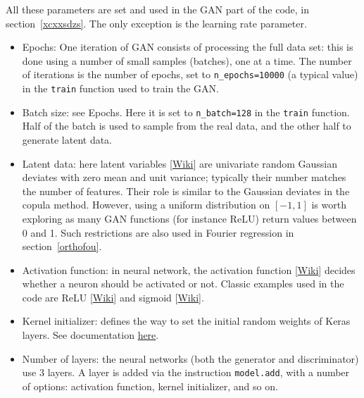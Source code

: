 \documentclass[oneside,10pt]{book}
\begin{document}
All these parameters are set and used in the GAN part of the code, in section~\ref{xcxxsdzs}. The only exception is the learning rate parameter.  \vspace{1ex}
\begin{itemize}
\item Epochs: One iteration of GAN consists of processing the full data set: this is done using a number of small samples (batches), one at a time.
  The number of iterations is the number of \textcolor{index}{epochs}, set to \texttt{n\_epochs=10000} (a typical value) in the \texttt{train} function used to train the GAN.
\item Batch size: see Epochs. Here it is set to \texttt{n\_batch=128} in the \texttt{train} function. Half of the batch is used to sample from the real data, and the other half to generate latent data.
\item Latent data: here \textcolor{index}{latent variables} [\href{https://en.wikipedia.org/wiki/Latent_and_observable_variables}{Wiki}] are univariate random Gaussian deviates with zero mean and unit variance; typically their number matches the number of features. Their role is similar to the Gaussian deviates in the copula method. However, using a uniform distribution on $[-1, 1]$ is worth exploring as many GAN functions
 (for instance ReLU) return values between 0 and 1. Such restrictions are also used in Fourier regression in section~\ref{orthofou}.
\item Activation function:
 in neural network, the \textcolor{index}{activation function} [\href{https://en.wikipedia.org/wiki/Activation_function}{Wiki}] decides whether a \textcolor{index}{neuron} should be activated or not. Classic examples used in the code are \textcolor{index}{ReLU} [\href{https://en.wikipedia.org/wiki/Rectifier_(neural_networks)}{Wiki}] and \textcolor{index}{sigmoid} [\href{https://en.wikipedia.org/wiki/Sigmoid_function}{Wiki}].
\item Kernel initializer: defines the way to set the initial random weights of Keras layers. See documentation
 \href{https://keras.io/api/layers/initializers/}{here}.
\item Number of layers: the neural networks  (both the generator and discriminator) use 3 layers.
A layer is added via the instruction \texttt{model.add}, with a number of options: activation function, kernel initializer, and so on.

\end{itemize}
\end{document}
